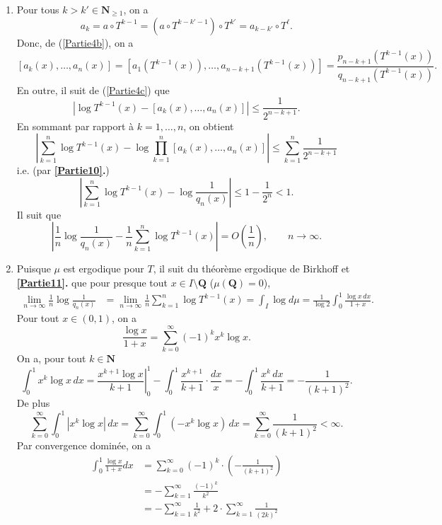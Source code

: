 \documentclass[french]{article}
\theoremstyle{definition}
\newcommand{\tuple}[1]{\left(#1\right)}
\newcommand{\oin}[1]{\left(#1\right)}
\newcommand{\abs}[1]{\left|#1\right|}
\newcommand{\Nbb}{\mathbf{N}}
\newcommand{\Qbb}{\mathbf{Q}}
\begin{document}
\begin{enumerate}
    \item \label{Partie11}
        Pour tous $k > k' \in \Nbb_{\ge 1}$, on a 
            $$a_{k} = a \circ T^{k-1} = (a \circ T^{k-k'-1}) \circ T^{k'} = a_{k - k'} \circ T^\ell.$$
        Donc, de (\ref{Partie4b}), on a
            $$[a_k(x),\ldots,a_n(x)] = [a_1(T^{k-1}(x)),\ldots,a_{n-k+1}(T^{k-1}(x))] = \frac{p_{n-k+1}(T^{k-1}(x))}{q_{n-k+1}(T^{k-1}(x))}.$$
        En outre, il suit de (\ref{Partie4c}) que
            $$|\log T^{k-1}(x) - [a_k(x),\ldots,a_n(x)]| \le \frac{1}{2^{n-k+1}}.$$
        En sommant par rapport \`a $k = 1,\ldots,n$, on obtient
            $$\abs{\sum_{k=1}^n \log T^{k-1}(x) - \log\prod_{k=1}^n [a_k(x),\ldots,a_n(x)]} \le \sum_{k=1}^n \frac{1}{2^{n-k+1}}$$
        i.e. (par {\bf \ref{Partie10}.})
            $$\abs{\sum_{k=1}^n \log T^{k-1}(x) - \log \frac{1}{q_n(x)}} \le 1 - \frac{1}{2^{n}} < 1.$$
        Il suit que
            $$\abs{\frac{1}{n}\log \frac{1}{q_n(x)} - \frac{1}{n}\sum_{k=1}^n \log T^{k-1}(x)} = O\tuple{\frac{1}{n}}, \qquad n \to \infty.$$
    \item \label{Partie12}
        Puisque $\mu$ est ergodique pour $T$, il suit du th\'eor\`eme ergodique de Birkhoff et {\bf \ref{Partie11}.} que pour presque tout $x \in I \setminus \Qbb$ ($\mu(\Qbb) = 0$), 
            \begin{align*}
                \lim_{n \to \infty}\frac{1}{n}\log\frac{1}{q_n(x)} & = \lim_{n \to \infty}\frac{1}{n}\sum_{k=1}^n \log T^{k-1}(x) = \int_I \log d\mu = \frac{1}{\log 2}\int_0^1 \frac{\log x\, dx}{1+x}.
            \end{align*}
        Pour tout $x \in (0,1)$, on a
            $$\frac{\log x}{1 + x} = \sum_{k = 0}^{\infty}(-1)^k x^k\log x.$$
        On a, pour tout $k \in \Nbb$
            $$\int_0^1 x^k \log x\,dx = \left. \frac{x^{k+1}\log x}{k+1} \right|_0^1 - \int_0^1 \frac{x^{k+1}}{k+1}\cdot \frac{dx}{x} = -\int_0^1 \frac{x^k\,dx}{k+1} = -\frac{1}{(k+1)^2}.$$
        De plus
            $$\sum_{k = 0}^{\infty}\int_0^1 |x^k \log x|\,dx = \sum_{k = 0}^{\infty} \int_0^1(-x^k \log x)\,dx = \sum_{k=0}^{\infty} \frac{1}{(k+1)^2} < \infty.$$
        Par convergence domin\'ee, on a
            \begin{align*}
                \int_0^1\frac{\log x}{1 + x} dx & = \sum_{k=0}^{\infty}(-1)^k \cdot \oin{-\frac{1}{(k+1)^2}} \\
                & = -\sum_{k=1}^{\infty} \frac{(-1)^k}{k^2}\\
                & = -\sum_{k=1}^{\infty}\frac{1}{k^2} + 2\cdot \sum_{k=1}^{\infty} \frac{1}{(2k)^2}\\

\end{align*}
\end{enumerate}
\end{document}
